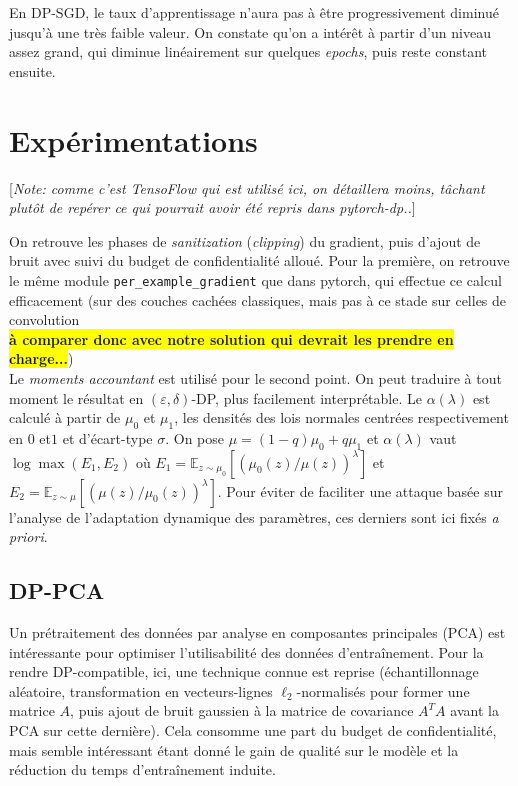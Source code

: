 \documentclass[a4paper,11pt]{article} %
\newcommand{\ttt}[1]{\texttt{#1}}
\newcommand{\rem}[1]{\colorbox{yellow}{\textbf{#1}}}
\begin{document}
En DP-SGD, le taux d'apprentissage n'aura pas à être progressivement diminué jusqu'à une très faible valeur. On constate qu'on a intérêt à partir d'un niveau assez grand, qui diminue linéairement sur quelques \emph{epochs}, puis reste constant ensuite.

\section{Expérimentations}

[\emph{Note: comme c'est TensoFlow qui est utilisé ici, on détaillera moins, tâchant plutôt de repérer ce qui pourrait avoir été repris dans pytorch-dp..}]

On retrouve les phases de \emph{sanitization} (\emph{clipping}) du gradient, puis d'ajout de bruit avec suivi du budget de confidentialité alloué. Pour la première, on retrouve le même module \ttt{per\_example\_gradient} que dans pytorch, qui effectue ce calcul efficacement (sur des couches cachées classiques, mais pas à ce stade sur celles de convolution\\ \rem{à comparer donc avec \og notre\fg{} solution qui devrait les prendre en charge...})\\

Le \emph{moments accountant} est utilisé pour le second point. On peut traduire à tout moment le résultat en $(\varepsilon, \delta)$-DP, plus facilement interprétable. Le $\alpha(\lambda)$ est calculé à partir de
$\mu_0$ et $\mu_1$, les densités des lois normales centrées respectivement en $0$ et$1$ et d'écart-type $\sigma$. On pose $\mu = (1-q)\mu_0 + q \mu_1$ et $\alpha(\lambda)$ vaut $\log \max(E_1, E_2)$ où $E_1 = \mathbb{E}_{z\sim\mu_0}[(\mu_0(z)/\mu(z))^\lambda]$ et $E_2 = \mathbb{E}_{z\sim\mu}[(\mu(z)/\mu_0(z))^\lambda]$.
Pour éviter de faciliter une attaque basée sur l'analyse de l'adaptation dynamique des paramètres, ces derniers sont ici fixés \emph{a priori}.

%
\subsection{DP-PCA}
%

Un prétraitement des données par analyse en composantes principales (PCA) est intéressante pour optimiser l'utilisabilité des données d'entraînement. Pour la rendre DP-compatible, ici, une technique connue est reprise (échantillonnage aléatoire, transformation en vecteurs-lignes $\ell_2$-normalisés pour former une matrice $A$, puis ajout de bruit gaussien à la matrice de covariance $A^TA$ avant la PCA sur cette dernière).
Cela consomme une part du budget de confidentialité, mais semble intéressant étant donné le gain de qualité sur le modèle et la réduction du temps d'entraînement induite.
\end{document}
